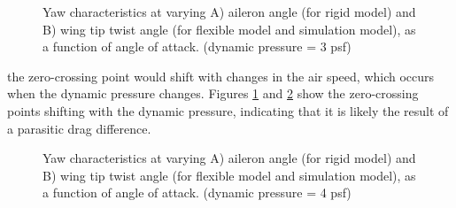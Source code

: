 \documentclass[11pt]{ucthesis}
\begin{document}
\begin{figure}[h]
\hfill
{}
\hfill
{}
\hfill
\caption{Yaw characteristics at varying A) aileron angle (for rigid model) and B) wing tip twist angle (for flexible model and simulation model), as a function of angle of attack. (dynamic pressure = 3 psf)}
\label{fig:Q3Yaw}
\end{figure}

the zero-crossing point would shift with changes in the air speed, which occurs when the dynamic pressure changes. Figures \ref{fig:Q3Yaw} and \ref{fig:Q4Yaw} show the zero-crossing points shifting with the dynamic pressure, indicating that it is likely the result of a parasitic drag difference.

\begin{figure}
\hfill
{}
\hfill
{}
\hfill
\caption{Yaw characteristics at varying A) aileron angle (for rigid model) and B) wing tip twist angle (for flexible model and simulation model), as a function of angle of attack. (dynamic pressure = 4 psf)}
\label{fig:Q4Yaw}
\end{figure}
\end{document}
